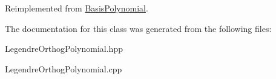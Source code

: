 Reimplemented from \hyperlink{classPecos_1_1BasisPolynomial_a8c1e8d014e82efc5a1c20f973b5bc715}{Basis\+Polynomial}.



The documentation for this class was generated from the following files\+:\begin{DoxyCompactItemize}
\item 
Legendre\+Orthog\+Polynomial.\+hpp\item 
Legendre\+Orthog\+Polynomial.\+cpp\end{DoxyCompactItemize}
